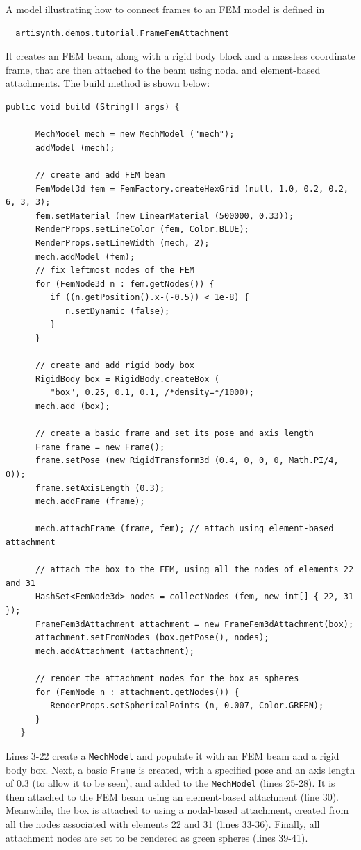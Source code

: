 A model illustrating how to connect frames to an FEM model 
is defined in
%
\begin{verbatim}
  artisynth.demos.tutorial.FrameFemAttachment
\end{verbatim}
%
It creates an FEM beam, along with a rigid body block and a 
massless coordinate frame, that are then attached to the beam
using nodal and element-based attachments. The build method is shown below:
\lstset{numbers=left}
\begin{lstlisting}[]
   public void build (String[] args) {

      MechModel mech = new MechModel ("mech");
      addModel (mech);

      // create and add FEM beam 
      FemModel3d fem = FemFactory.createHexGrid (null, 1.0, 0.2, 0.2, 6, 3, 3);
      fem.setMaterial (new LinearMaterial (500000, 0.33));
      RenderProps.setLineColor (fem, Color.BLUE);
      RenderProps.setLineWidth (mech, 2);
      mech.addModel (fem);
      // fix leftmost nodes of the FEM
      for (FemNode3d n : fem.getNodes()) {
         if ((n.getPosition().x-(-0.5)) < 1e-8) {
            n.setDynamic (false);
         }
      }

      // create and add rigid body box
      RigidBody box = RigidBody.createBox (
         "box", 0.25, 0.1, 0.1, /*density=*/1000);
      mech.add (box);

      // create a basic frame and set its pose and axis length
      Frame frame = new Frame();
      frame.setPose (new RigidTransform3d (0.4, 0, 0, 0, Math.PI/4, 0));
      frame.setAxisLength (0.3);
      mech.addFrame (frame);

      mech.attachFrame (frame, fem); // attach using element-based attachment

      // attach the box to the FEM, using all the nodes of elements 22 and 31
      HashSet<FemNode3d> nodes = collectNodes (fem, new int[] { 22, 31 });
      FrameFem3dAttachment attachment = new FrameFem3dAttachment(box);
      attachment.setFromNodes (box.getPose(), nodes);
      mech.addAttachment (attachment);

      // render the attachment nodes for the box as spheres
      for (FemNode n : attachment.getNodes()) {
         RenderProps.setSphericalPoints (n, 0.007, Color.GREEN);
      }
   }
\end{lstlisting}
\lstset{numbers=none} 
Lines 3-22 create a {\tt MechModel} and populate it with an FEM beam
and a rigid body box. Next, a basic {\tt Frame} is created, with a
specified pose and an axis length of 0.3 (to allow it to be seen), and
added to the {\tt MechModel} (lines 25-28). It is then attached to the
FEM beam using an element-based attachment (line 30).  Meanwhile, the
box is attached to using a nodal-based attachment, created from all
the nodes associated with elements 22 and 31 (lines 33-36). Finally,
all attachment nodes are set to be rendered as green spheres (lines
39-41).

